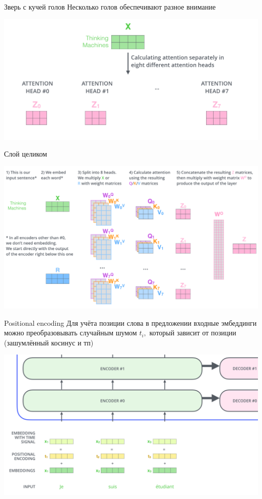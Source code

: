 \documentclass[notes,12pt, aspectratio=169]{beamer}
\begin{document}
\begin{frame}{Зверь с кучей голов} 
Несколько голов обеспечивают разное внимание
\begin{center}
	\includegraphics[width=.8\linewidth]{many_hads.png}
\end{center}
\end{frame}


\begin{frame}{Слой целиком} 
\begin{center}
	\includegraphics[width=.85\linewidth]{together.png}
\end{center}
\end{frame}


\begin{frame}{Positional encoding} 
Для учёта позиции слова в предложении входные эмбеддинги можно преобразовывать случайным шумом $t_i,$ который зависит от позиции (зашумлённый косинус и тп) 

\begin{center}
	\includegraphics[width=.8\linewidth]{positional_encoding.png}
\end{center}
\end{frame}
\end{document}

